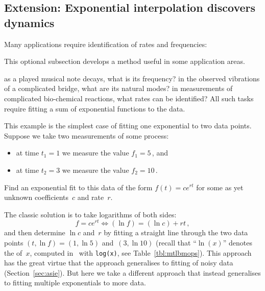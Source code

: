 









\begin{draft}%
\subsection{Extension: Exponential interpolation discovers dynamics}
\label{sec:eidd}


Many applications require identification of rates and frequencies:
\begin{aside}
This optional subsection develops a method useful in some application areas.
\end{aside}%
as a played musical note decays, what is its frequency?
in the observed vibrations of a complicated bridge, what are its natural modes?
in measurements of complicated bio-chemical reactions, what rates can be identified?
All such tasks require fitting a sum of exponential functions to the data.


\begin{example} \label{eg:}
This example is the simplest case of fitting one exponential to two data points.
Suppose we take two measurements of some process: 
\begin{itemize}
\item at time \(t_1=1\) we measure the value \(f_1=5\)\,, and 
\item at time \(t_2=3\) we measure the value \(f_2=10\)\,.
\end{itemize}
Find an exponential fit to this data of the form \(f(t)=ce^{rt}\) for some as yet unknown coefficients~\(c\) and rate~\(r\).
\begin{solution} 
The classic solution is to take logarithms of both sides:
\begin{equation*}
f=ce^{rt} \iff (\ln f)=(\ln c)+rt\,,
\end{equation*}
and then determine \(\ln c\) and~\(r\) by fitting a straight line through the two data points \((t,\ln f)=(1,\ln5)\) and~\((3,\ln10)\)
(recall that ``\(\ln(x)\)'' denotes the  of~\(x\),  computed in \script\ with \verb|log(x)|, see Table~\ref{tbl:mtlbmops}).
This approach has the great virtue that the approach generalises to fitting of noisy data (Section~\ref{sec:asie}).
But here we take a different approach that instead generalises to fitting multiple exponentials to more data.


\end{solution}
\end{example}
\end{draft}

